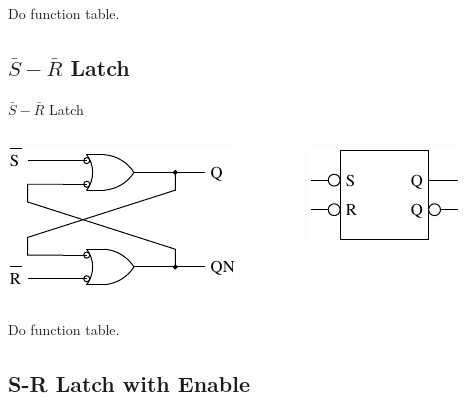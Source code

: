 Do function table.

\subsection{$\bar{S}-\bar{R}$ Latch}

\begin{frame}{$\bar{S}-\bar{R}$ Latch}
  \begin{columns}
    \begin{column}{6cm}
      \begin{center}
        \includegraphics{SbarRbarLatchCircuit}
      \end{center}
    \end{column}
    \begin{column}{6cm}
      \begin{center}
        \includegraphics{SbarRbarLatchSchematic}
      \end{center}
    \end{column}
  \end{columns}
\end{frame}

Do function table.

\subsection{S-R Latch with Enable}

